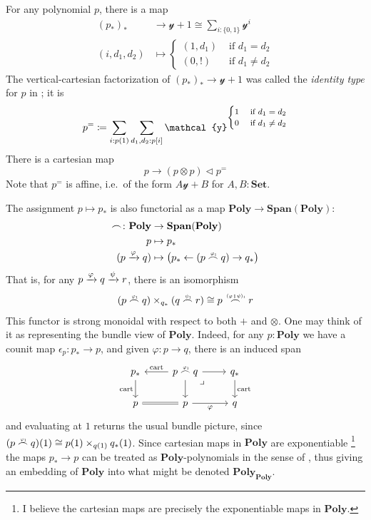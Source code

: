 \documentclass[11pt, one side, article]{memoir}
\theoremstyle{definition}
\theoremstyle{plain}
\newcommand{\Cat}[1]{\mathbf{#1}}%
\newcommand{\then}{\mathbin{\fatsemi}}
\newcommand{\To}[2][]{\xrightarrow[#1]{\tn{$#2$}}}
\newcommand{\from}{\leftarrow}
\newcommand{\tn}[1]{\textnormal{#1}}
\newcommand{\smset}{\Cat{Set}}
\newcommand{\yon}{{\mathcal{y}}}
\newcommand{\poly}{\Cat{Poly}}
\newcommand{\Span}{\Cat{Span}}
\newcommand{\cart}{\tn{cart}}
\newcommand{\0}{\textsf{0}}
\newcommand{\1}{\tn{\textsf{1}}}
\newcommand{\tri}{\mathbin{\triangleleft}}
\newcommand{\indexcoclscale}[1]{\scalebox{.7}{#1}}
\newcommand{\cocl}[1]{
	\scriptsize\overset{\,\indexcoclscale{$#1$}}{\frown}\normalsize
}
\begin{document}
For any polynomial $p$, there is a map
\begin{align}
	(p_*)_*&\to\yon+1\cong\sum_{i:\{0,1\}}\yon^i\\
	(i,d_1,d_2)&\mapsto
	\begin{cases}
		(1,d_1)&\text{ if } d_1=d_2 \\
		(0,!)&\text{ if }d_1\neq d_2
	\end{cases}
\end{align}
The vertical-cartesian factorization of $(p_*)_*\to\yon+1$ was called the \emph{identity type} for $p$ in \cite{aberle2024polynomial}; it is
\begin{equation}
	p^=\coloneqq\sum_{i:p(1)}\sum_{d_1,d_2:p[i]}\yon^{\footnotesize\begin{cases}1&\text{ if } d_1=d_2 \\0&\text{ if }d_1\neq d_2\end{cases}}
\end{equation}
There is a cartesian map
\begin{equation}
	p\to (p\otimes p)\tri p^=
\end{equation}
Note that $p^=$ is affine, i.e.\ of the form $A\yon+B$ for $A,B:\smset$.

The assignment $p\mapsto p_*$ is also functorial as a map $\poly\to\Span(\poly)$:
\begin{align}
	\cocl{}\colon\poly&\to\Span(\poly)\\
	p&\mapsto p_*\\
	(p\To{\varphi}q)&\mapsto\big( p_*\from(p\cocl{\varphi_1}q)\to q_*\big)
\end{align}\goodbreak
That is, for any $p\To{\varphi}q\To{\psi}r$, there is an isomorphism
\begin{equation}
	(p\cocl{\varphi_1}q)\times_{ q_*}(q\cocl{\psi_1}r)\cong p\cocl{(\varphi\then\psi)_1}r
\end{equation}
This functor is strong monoidal with respect to both $+$ and $\otimes$. One may think of it as representing the bundle view of $\poly$. Indeed, for any $p:\poly$ we have a counit map $\epsilon_p\colon p_*\to p$, and given $\varphi\colon p\to q$, there is an induced span
\begin{equation}
\begin{tikzcd}
	 p_*\ar[d, "\cart"']&p\cocl{\varphi_1}q\ar[d]\ar[l, "\cart"']\ar[r]& q_*\ar[d, "\cart"]\\
	p\ar[r, equal]&p\ar[r,"\varphi"']&q\ar[ul, phantom, very near end, "\lrcorner"]
\end{tikzcd}
\end{equation}
and evaluating at $1$ returns the usual bundle picture, since $(p\cocl{\varphi_1}q)(1)\cong p(1)\times_{q(1)}q_*(1)$. Since cartesian maps in $\poly$ are exponentiable%
\footnote{I believe the cartesian maps are precisely the exponentiable maps in $\poly$.}
the maps $p_*\to p$ can be treated as $\poly$-polynomials in the sense of \cite{weber2015polynomials}, thus giving an embedding of $\poly$ into what might be denoted $\poly_\poly$.
\end{document}
